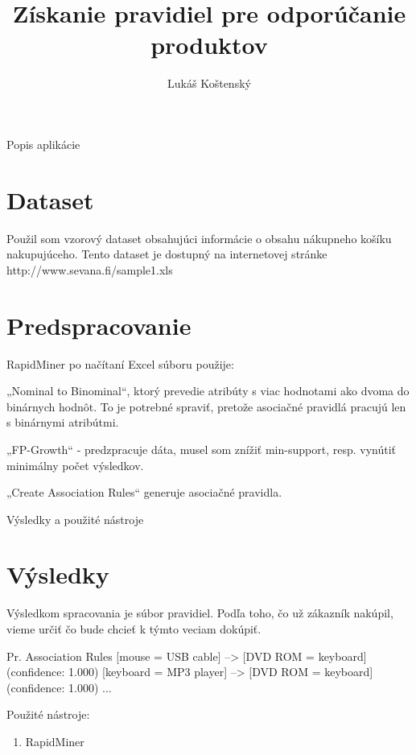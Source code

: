 \documentclass[11pt]{beamer}
\author{Lukáš Koštenský}
\title{Získanie pravidiel pre odporúčanie produktov}
\institute{MI-DDW}
\begin{document}
\begin{frame}
\titlepage
\end{frame}


\begin{frame}{Popis aplikácie}

\section{Dataset}
Použil som vzorový dataset obsahujúci informácie o obsahu nákupneho košíku nakupujúceho. Tento dataset je dostupný na internetovej stránke http://www.sevana.fi/sample1.xls

\section{Predspracovanie}

RapidMiner po načítaní Excel súboru použije:

„Nominal to Binominal“, ktorý prevedie atribúty s viac hodnotami ako dvoma do binárnych hodnôt. To je potrebné spraviť, pretože asociačné pravidlá pracujú len s binárnymi atribútmi.

„FP-Growth“ - predzpracuje dáta, musel som znížiť min-support, resp. vynútiť minimálny počet výsledkov.

„Create Association Rules“ generuje asociačné pravidla.
\end{frame}
\begin{frame}{Výsledky a použité nástroje}

\section{Výsledky}
Výsledkom spracovania je súbor pravidiel. Podľa toho, čo už zákazník nakúpil, vieme určiť čo bude chcieť k týmto veciam dokúpiť.

Pr.
Association Rules
[mouse = USB cable] --> [DVD ROM = keyboard] (confidence: 1.000)
[keyboard = MP3 player] --> [DVD ROM = keyboard] (confidence: 1.000)
...

Použité nástroje:
\begin{enumerate}
\item RapidMiner 
\end{enumerate}
\end{frame}
\end{document}
